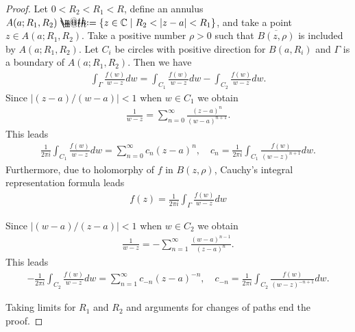 \documentclass[openany, a4paper, oneside]{jsbook}
\makeatletter
\newcommand*{\defeq}{\mathrel{\rlap{%
\raisebox{0.3ex}{$\m@th\cdot$}}%
\raisebox{-0.3ex}{$\m@th\cdot$}}%
=}
\theoremstyle{break}
\theoremstyle{breakdefn}
\newcommand{\abs}[1]{\left|#1\right|}
\newcommand{\relmiddle}[1]{\mathrel{}\middle#1\mathrel{}}
\newcommand{\set}[2]{\left\{#1 \relmiddle| #2\right\}}
\newcommand{\bbC}{\mathbb{C}}
\makeatother
\begin{document}
\begin{proof}
Let $0 < R_2 < R_1 < R$, define an annulus $A (a; R_1, R_2) \defeq \set{z \in \bbC}{R_2 < \abs{z - a} < R_1}$,
and take a point $z \in A (a; R_1, R_2)$.
Take a positive number $\rho > 0$ such that $\overline{B (z, \rho)}$ is included by $A (a; R_1, R_2)$.
Let $C_i$ be circles with positive direction for $B (a, R_i)$ and $\Gamma$ is a boundary of $A (a; R_1, R_2)$.
Then we have
\begin{align}
 \int_{\Gamma} \frac{f (w)}{w - z} dw
 =
 \int_{C_1} \frac{f (w)}{w - z} dw - \int_{C_2} \frac{f (w)}{w - z} dw.
\end{align}
Since $\abs{(z - a) / (w - a)} < 1$ when $w \in C_1$ we obtain
\begin{align}
 \frac{1}{w - z} = \sum_{n=0}^{\infty} \frac{(z - a)^n}{(w - a)^{n+1}}.
\end{align}
This leads
\begin{align}
 \frac{1}{2 \pi i} \int_{C_1} \frac{f (w)}{w - z} dw
 =
 \sum_{n=0}^{\infty} c_n (z - a)^n, \quad
 c_n
 =
 \frac{1}{2 \pi i} \int_{C_1} \frac{f (w)}{(w - z)^{n+1}} dw.
\end{align}
Furthermore, due to holomorphy of $f$ in $B (z, \rho)$, Cauchy's integral representation formula leads
\begin{align}
 f (z)
 =
 \frac{1}{2 \pi i} \int_{\Gamma} \frac{f (w)}{w - z} dw
\end{align}

Since $\abs{(w - a) / (z - a)} < 1$ when $w \in C_2$ we obtain
\begin{align}
 \frac{1}{w - z} = - \sum_{n=1}^{\infty} \frac{(w - a)^{n-1}}{(z - a)^{n}}.
\end{align}
This leads
\begin{align}
 -\frac{1}{2 \pi i} \int_{C_2} \frac{f (w)}{w - z} dw
 =
 \sum_{n=1}^{\infty} c_{-n} (z - a)^{-n}, \quad
 c_{-n}
 =
 \frac{1}{2 \pi i} \int_{C_2} \frac{f (w)}{(w - z)^{-n+1}} dw.
\end{align}

Taking limits for $R_1$ and $R_2$ and arguments for changes of paths end the proof.
\end{proof}
\end{document}
